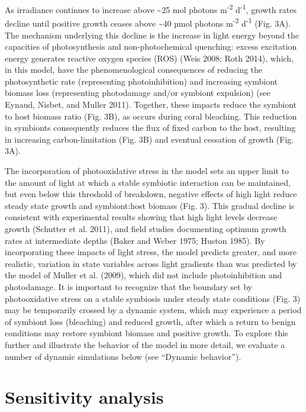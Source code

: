\documentclass[]{elsarticle} %
\begin{document}
As irradiance continues to increase above \textasciitilde{}25 mol
photons m\textsuperscript{-2} d\textsuperscript{-1}, growth rates
decline until positive growth ceases above \textasciitilde{}40 µmol
photons m\textsuperscript{-2} d\textsuperscript{-1} (Fig. 3A). The
mechanism underlying this decline is the increase in light energy beyond
the capacities of photosynthesis and non-photochemical quenching: excess
excitation energy generates reactive oxygen species (ROS) (Weis 2008;
Roth 2014), which, in this model, have the phenomenological consequences
of reducing the photosynthetic rate (representing photoinhibition) and
increasing symbiont biomass loss (representing photodamage and/or
symbiont expulsion) (see Eynaud, Nisbet, and Muller 2011). Together,
these impacts reduce the symbiont to host biomass ratio (Fig. 3B), as
occurs during coral bleaching. This reduction in symbionts consequently
reduces the flux of fixed carbon to the host, resulting in increasing
carbon-limitation (Fig. 3B) and eventual cessation of growth (Fig. 3A).

The incorporation of photooxidative stress in the model sets an upper
limit to the amount of light at which a stable symbiotic interaction can
be maintained, but even below this threshold of breakdown, negative
effects of high light reduce steady state growth and symbiont:host
biomass (Fig. 3). This gradual decline is consistent with experimental
results showing that high light levels decrease growth (Schutter et al.
2011), and field studies documenting optimum growth rates at
intermediate depths (Baker and Weber 1975; Huston 1985). By
incorporating these impacts of light stress, the model predicts greater,
and more realistic, variation in state variables across light gradients
than was predicted by the model of Muller et al. (2009), which did not
include photoinhibition and photodamage. It is important to recognize
that the boundary set by photooxidative stress on a stable symbiosis
under steady state conditions (Fig. 3) may be temporarily crossed by a
dynamic system, which may experience a period of symbiont loss
(bleaching) and reduced growth, after which a return to benign
conditions may restore symbiont biomass and positive growth. To explore
this further and illustrate the behavior of the model in more detail, we
evaluate a number of dynamic simulations below (see ``Dynamic
behavior'').

\section{Sensitivity analysis}\label{sensitivity-analysis}
\end{document}
